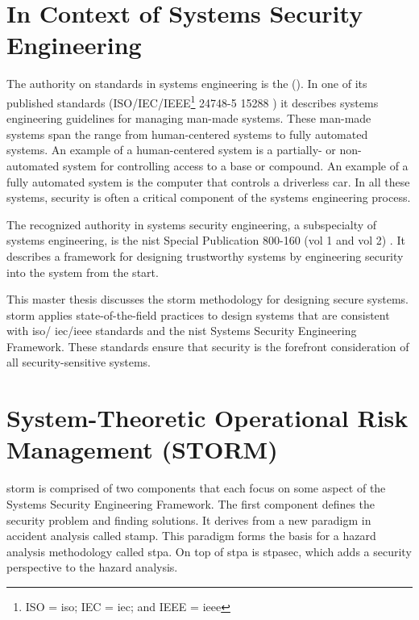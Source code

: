\documentclass[../../main/main.tex]{subfiles}
\begin{document}
\section{In Context of Systems Security Engineering}\label{sec:intro:motivation}
The authority on standards in systems engineering is the  ().  In one of its published standards (ISO/IEC/IEEE\footnote{ISO = \gls{iso}; IEC = \gls{iec}; and IEEE = \gls{ieee}} 24748-5 \cite{iso247482017} 15288 \cite{iso15288}) it describes systems engineering guidelines for managing man-made systems.  These man-made systems span the range from human-centered systems to fully automated systems.  An example of a human-centered system is a partially- or non-automated system for controlling access to a base or compound.  An example of a fully automated system is the computer that controls a driverless car.  In all these systems, security is often a critical component of the systems engineering process.


The recognized authority in systems security engineering, a subspecialty of systems engineering, is the \gls{nist} Special Publication 800-160 (vol 1 and vol 2) \cite{NIST800160}.  It describes a framework for designing trustworthy systems by engineering security into the system from the start.  


This master thesis discusses the \Gls{storm} methodology for designing secure systems.  \gls{storm} applies state-of-the-field practices to design systems that are consistent with \gls{iso}/ \gls{iec}/\gls{ieee} standards and the \gls{nist} Systems Security Engineering Framework.  These standards ensure that security is the forefront  consideration of all security-sensitive systems.  
%

\section{System-Theoretic Operational Risk Management (STORM)}\label{sec:intro:storm}
\Gls{storm} is comprised of two components that each focus on some aspect of the Systems Security Engineering Framework.  The first component defines the security problem and finding solutions. It derives from a new paradigm in accident analysis called \Gls{stamp}.  This paradigm forms the basis for a hazard analysis methodology called \Gls{stpa}.  On top of \gls{stpa} is \Gls{stpasec}, which adds a security perspective to the hazard analysis. 
\end{document}
